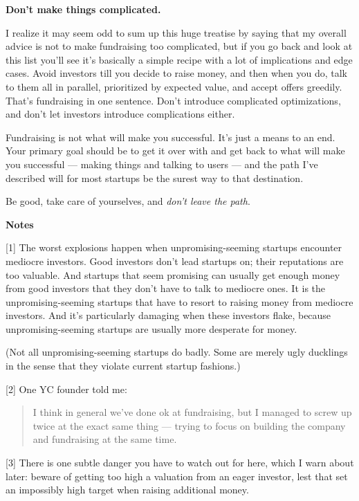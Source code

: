 \textbf{Don't make things complicated.}

I realize it may seem odd to sum up this huge treatise by saying that my
overall advice is not to make fundraising too complicated, but if you go
back and look at this list you'll see it's basically a simple recipe
with a lot of implications and edge cases. Avoid investors till you
decide to raise money, and then when you do, talk to them all in
parallel, prioritized by expected value, and accept offers greedily.
That's fundraising in one sentence. Don't introduce complicated
optimizations, and don't let investors introduce complications either.

Fundraising is not what will make you successful. It's just a means to
an end. Your primary goal should be to get it over with and get back to
what will make you successful --- making things and talking to users ---
and the path I've described will for most startups be the surest way to
that destination.

Be good, take care of yourselves, and \emph{don't leave the path}.

\textbf{Notes}

{[}1{]} The worst explosions happen when unpromising-seeming startups
encounter mediocre investors. Good investors don't lead startups on;
their reputations are too valuable. And startups that seem promising can
usually get enough money from good investors that they don't have to
talk to mediocre ones. It is the unpromising-seeming startups that have
to resort to raising money from mediocre investors. And it's
particularly damaging when these investors flake, because
unpromising-seeming startups are usually more desperate for money.

(Not all unpromising-seeming startups do badly. Some are merely ugly
ducklings in the sense that they violate current startup fashions.)

{[}2{]} One YC founder told me:

\begin{quote}
I think in general we've done ok at fundraising, but I managed to screw
up twice at the exact same thing --- trying to focus on building the
company and fundraising at the same time.
\end{quote}

{[}3{]} There is one subtle danger you have to watch out for here, which
I warn about later: beware of getting too high a valuation from an eager
investor, lest that set an impossibly high target when raising
additional money.

